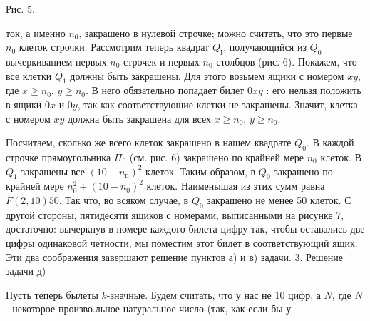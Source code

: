 \documentclass{article}
\begin{document}
\begin{minipage}{0.45\textwidth}
\begin{flushleft}
Рис. 5.
\end{flushleft}
\newline
ток, а именно $n_0$, закрашено в нулевой строчке; можно считать, что это первые $n_0$ клеток строчки. Рассмотрим теперь квадрат $Q_{\mathrm{I}}$, получающийся из $Q_0$ вычеркиванием первых $n_0$ строчек и первых $n_0$ столбцов (рис. 6). Покажем, что все клетки $Q_1$ должны быть закрашены. Для этого возьмем ящики с номером $x y$, где $x \geqslant n_0$, $y \geqslant n_0$. В него обязательно попадает билет $0 x y$ : его нельзя положить в ящики $0 x$ и $0 y$, так как соответствующие клетки не закрашены. Значит, клетка с номером $x y$ должна быть закрашена для всех $x \geqslant n_0$, $y \geqslant n_0$.

Посчитаем, сколько же всего клеток закрашено в нашем квадрате $Q_0$. В каждой строчке прямоугольника $\Pi_0$ (см. рис. 6) закрашено по крайней мере $n_0$ клеток. В $Q_1$ закрашены все $\left(10-n_{\mathrm{n}}\right)^2$ клеток. Таким образом, в $Q_0$ закрашено по крайней мере $n_0^2+\left(10-n_0\right)^2$ клеток. Наименышая из этих сумм равна $F(2,10) 50$. Так что, во всяком случае, в $Q_0$ закрашено не менее 50 клеток. С другой стороны, пятидесяти ящиков с номерами, выписанными на рисунке 7, достаточно: вычеркнув в номере каждого билета цифру так, чтобы оставались две цифры одинаковой четности, мы поместим этот билет в соответствующий ящик. Эти два соображения завершают решение пунктов а) и в) задачи.
3. Решение задачи д)

Пусть теперь былеты $k$-значные. Будем считать, что у нас не 10 цифр, а $N$, где $N$ - некоторое произво.льное натуральное число (так, как если бы у
\end{minipage}
\hfill
\end{document}
